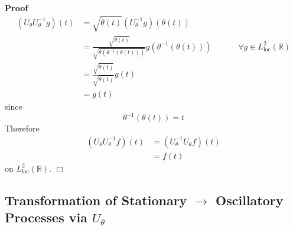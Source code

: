 \documentclass{article}
\newcommand{\tmop}[1]{\ensuremath{\operatorname{#1}}}
\newenvironment{proof}{\noindent\textbf{Proof\ }}{\hspace*{\fill}$\Box$\medskip}
\begin{document}
\begin{proof}
\begin{equation}
    \begin{array}{llcccc}
      (U_{\theta} U_{\theta}^{- 1} g) (t) & = \sqrt{\dot{\theta} (t)} 
      (U_{\theta}^{- 1} g) (\theta (t)) &  &  &  & \\
      & = \frac{\sqrt{\dot{\theta} (t)}}{\sqrt{\dot{\theta} (\theta^{- 1}
      (\theta (t)))}} g (\theta^{- 1} (\theta (t))) &  &  &  & \forall g \in
      L^2_{\tmop{loc}} (\mathbb{R})\\
      & = \frac{\sqrt{\dot{\theta} (t)}}{\sqrt{\dot{\theta} (t)}} g (t) &  & 
      &  & \\
      & = g (t) &  &  &  & 
    \end{array}
  \end{equation}
  since
  \begin{equation}
    \theta^{- 1} (\theta (t)) = t
  \end{equation}
  Therefore
  \begin{equation}
    \begin{array}{ll}
      (U_{\theta} U_{\theta}^{- 1} f) (t) & = (U_{\theta}^{- 1} U_{\theta} f)
      (t)\\
      & = f (t)
    \end{array}
  \end{equation}
  on $L^2_{\tmop{loc}} (\mathbb{R})$.
\end{proof}

\subsection{Transformation of Stationary $\to$ Oscillatory Processes via
$U_{\theta}$}
\end{document}
